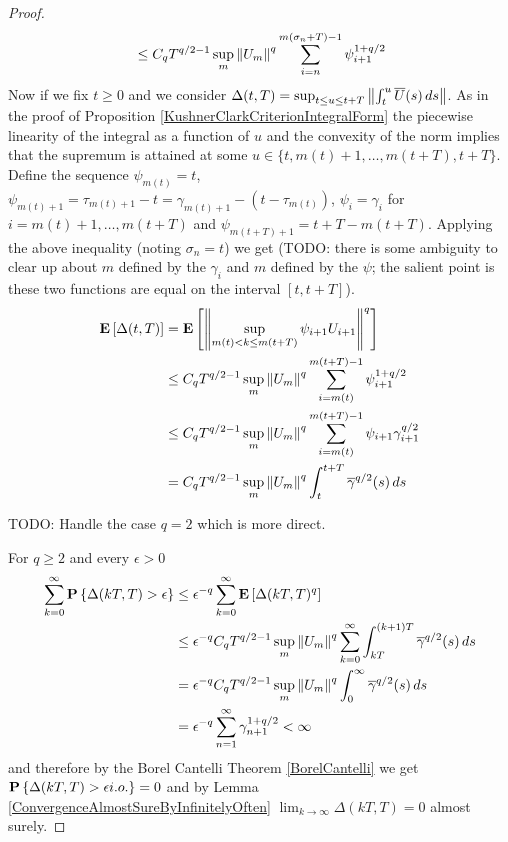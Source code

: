 \begin{proof}
\begin{align*}
&\leq C_q  T^{q/2 -1} \sup_m \left \lVert U_m \right \rVert^q \sum_{i=n}^{m(\sigma_n + T)-1} \psi_{i+1}^{1+q/2} \\
\end{align*}
Now if we fix $t \geq 0$ and we consider $\Delta(t,T) = \sup_{t \leq u \leq t+T} \left \lVert \int_t^{u} \overline{U}(s) \, ds \right \rVert$.  As in the proof of Proposition \ref{KushnerClarkCriterionIntegralForm} the piecewise linearity of the integral as a function of $u$ and the convexity of the norm implies that the supremum is attained at some $u \in \lbrace t, m(t)+1, \dotsc, m(t+T), t+T \rbrace$.
Define the sequence $\psi_{m(t)} = t$, $\psi_{m(t)+1} = \tau_{m(t)+1} - t = \gamma_{m(t)+1} - (t - \tau_{m(t)})$, $\psi_i = \gamma_i$ for $i=m(t)+1, \dotsc, m(t+T)$ and $\psi_{m(t+T)+1} = t+T - m(t+T)$.  Applying the above inequality (noting $\sigma_n = t$) we get (TODO: there is some ambiguity to clear up about $m$ defined by the $\gamma_i$ and $m$ defined by the $\psi$; the salient point is these two functions are equal on the interval $[t,t+T]$).
\begin{align*}
\textbf{E}\left[\Delta(t,T)\right] &= \textbf{E}\left[\left \lVert \sup_{m(t) < k \leq m(t+T)} \psi_{i+1} U_{i+1} \right \rVert^q\right] \\
&\leq C_q  T^{q/2 -1} \sup_m \left \lVert U_m \right \rVert^q \sum_{i=m(t)}^{m(t + T)-1} \psi_{i+1}^{1+q/2}  \\
&\leq C_q  T^{q/2 -1} \sup_m \left \lVert U_m \right \rVert^q \sum_{i=m(t)}^{m(t + T)-1} \psi_{i+1} \gamma_{i+1}^{q/2}  \\
&=C_q  T^{q/2 -1} \sup_m \left \lVert U_m \right \rVert^q \int_t^{t+T} \overline{\gamma}^{q/2}(s) \, ds
\end{align*}

TODO: Handle the case $q=2$ which is more direct.

For $q \geq 2$ and every $\epsilon > 0$
\begin{align*}
\sum_{k=0}^\infty \textbf{P}\left \{\Delta(kT,T) > \epsilon \right \} &\leq \epsilon^{-q} \sum_{k=0}^\infty \textbf{E}\left[\Delta(kT, T)^q\right] \\
&\leq \epsilon^{-q} C_q T^{q/2 -1} \sup_m \left \lVert U_m \right \rVert^q \sum_{k=0}^\infty \int_{kT}^{(k+1)T} \overline{\gamma}^{q/2}(s) \, ds \\
&= \epsilon^{-q} C_q T^{q/2 -1} \sup_m \left \lVert U_m \right \rVert^q \int_0^\infty \overline{\gamma}^{q/2}(s) \, ds \\
&= \epsilon^{-q} \sum_{n=1}^\infty \gamma_{n+1}^{1 + q/2} < \infty
\end{align*}
and therefore by the Borel Cantelli Theorem \ref{BorelCantelli} we get $\textbf{P}\left \{\Delta(kT,T) > \epsilon i.o. \right \} =0$ and by Lemma \ref{ConvergenceAlmostSureByInfinitelyOften}
$\lim_{k \to \infty} \Delta(kT,T) = 0$ almost surely.


\end{proof}
